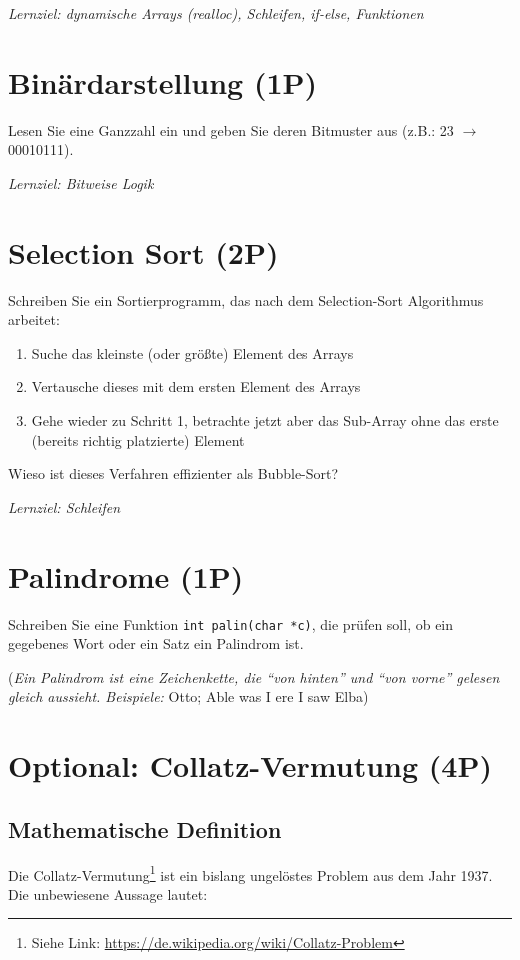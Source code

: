 \documentclass[
	ngerman,
	fontsize=10pt,
	parskip=half,
	titlepage=true,
	DIV=12
]{scrartcl}
\begin{document}
\emph{Lernziel: dynamische Arrays (realloc), Schleifen, if-else, Funktionen}

\section{Binärdarstellung (1P)}
Lesen Sie eine Ganzzahl ein und geben Sie deren Bitmuster aus (z.B.: 23 $\rightarrow$ 00010111).

\emph{Lernziel: Bitweise Logik}

\section{Selection Sort (2P)}
Schreiben Sie ein Sortierprogramm, das nach dem Selection-Sort Algorithmus arbeitet: 
\begin{enumerate}
\item Suche das kleinste (oder größte) Element des Arrays
\item Vertausche dieses mit dem ersten Element des Arrays
\item Gehe wieder zu Schritt 1, betrachte jetzt aber das Sub-Array ohne das erste (bereits richtig platzierte) Element
\end{enumerate}
Wieso ist dieses Verfahren effizienter als Bubble-Sort?

\emph{Lernziel: Schleifen}

\section{Palindrome (1P)}
Schreiben Sie eine Funktion \texttt{int palin(char *c)}, die prüfen soll, ob ein gegebenes Wort oder ein Satz ein Palindrom ist. 

(\emph{Ein Palindrom ist eine Zeichenkette, die \enquote{von hinten} und \enquote{von vorne} gelesen gleich aussieht. Beispiele:} Otto; Able was I ere I saw Elba)

\section{Optional: Collatz-Vermutung (4P)}
\subsection{Mathematische Definition}
Die Collatz-Vermutung\footnote{Siehe Link: \url{https://de.wikipedia.org/wiki/Collatz-Problem}} ist ein bislang ungelöstes Problem aus dem Jahr 1937. Die unbewiesene Aussage lautet:
\end{document}
